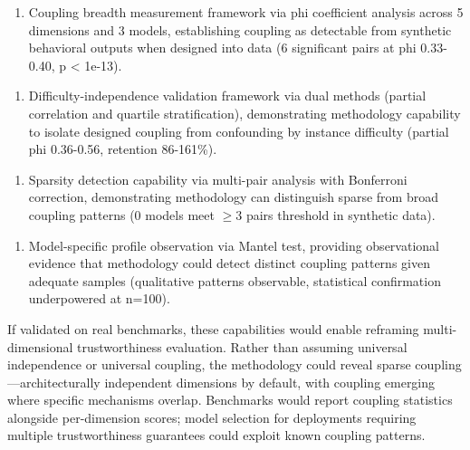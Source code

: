 \begin{enumerate}
\item Coupling breadth measurement framework via phi coefficient analysis across 5 dimensions and 3 models, establishing coupling as detectable from synthetic behavioral outputs when designed into data (6 significant pairs at phi 0.33-0.40, p < 1e-13).
\end{enumerate}

\begin{enumerate}
\item Difficulty-independence validation framework via dual methods (partial correlation and quartile stratification), demonstrating methodology capability to isolate designed coupling from confounding by instance difficulty (partial phi 0.36-0.56, retention 86-161\%).
\end{enumerate}

\begin{enumerate}
\item Sparsity detection capability via multi-pair analysis with Bonferroni correction, demonstrating methodology can distinguish sparse from broad coupling patterns (0 models meet $\geq 3$ pairs threshold in synthetic data).
\end{enumerate}

\begin{enumerate}
\item Model-specific profile observation via Mantel test, providing observational evidence that methodology could detect distinct coupling patterns given adequate samples (qualitative patterns observable, statistical confirmation underpowered at n=100).
\end{enumerate}

If validated on real benchmarks, these capabilities would enable reframing multi-dimensional trustworthiness evaluation. Rather than assuming universal independence or universal coupling, the methodology could reveal sparse coupling---architecturally independent dimensions by default, with coupling emerging where specific mechanisms overlap. Benchmarks would report coupling statistics alongside per-dimension scores; model selection for deployments requiring multiple trustworthiness guarantees could exploit known coupling patterns.
